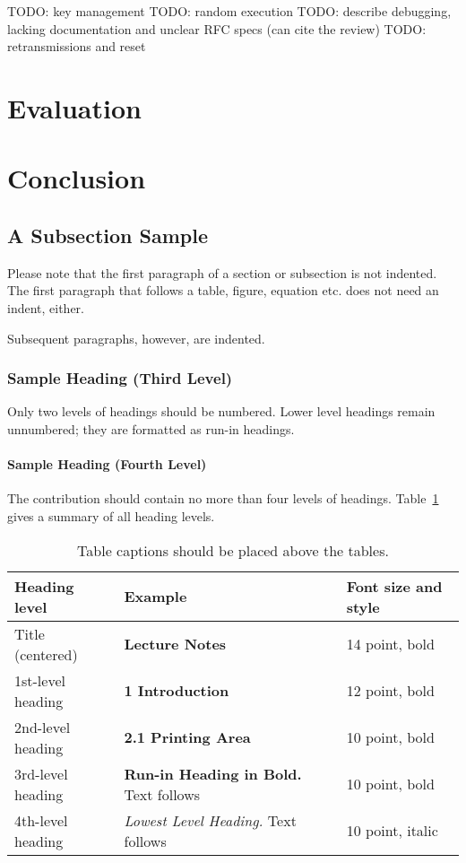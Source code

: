 \documentclass[runningheads]{llncs}
\begin{document}
TODO: key management
TODO: random execution
TODO: describe debugging, lacking documentation and unclear RFC specs (can cite the review)
TODO: retransmissions and reset

\section{Evaluation} \label{chap:5} %
\section{Conclusion} \label{chap:6} %

\subsection{A Subsection Sample}
Please note that the first paragraph of a section or subsection is
not indented. The first paragraph that follows a table, figure,
equation etc. does not need an indent, either.

Subsequent paragraphs, however, are indented.

\subsubsection{Sample Heading (Third Level)} Only two levels of
headings should be numbered. Lower level headings remain unnumbered;
they are formatted as run-in headings.

\paragraph{Sample Heading (Fourth Level)}
The contribution should contain no more than four levels of
headings. Table~\ref{tab1} gives a summary of all heading levels.

\begin{table}
\caption{Table captions should be placed above the
tables.}\label{tab1}
\begin{tabular}{|l|l|l|}
\hline
Heading level &  Example & Font size and style\\
\hline
Title (centered) &  {\Large\bfseries Lecture Notes} & 14 point, bold\\
1st-level heading &  {\large\bfseries 1 Introduction} & 12 point, bold\\
2nd-level heading & {\bfseries 2.1 Printing Area} & 10 point, bold\\
3rd-level heading & {\bfseries Run-in Heading in Bold.} Text follows & 10 point, bold\\
4th-level heading & {\itshape Lowest Level Heading.} Text follows & 10 point, italic\\
\hline
\end{tabular}
\end{table}
\end{document}
